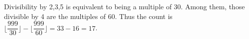 Divisibility by 2,3,5 is equivalent to being a multiple of 30. Among them, those divisible by 4 are the multiples of 60. Thus the count is $\lfloor\dfrac{999}{30}\rfloor-\lfloor\dfrac{999}{60}\rfloor=33-16=\boxed{17}$.
